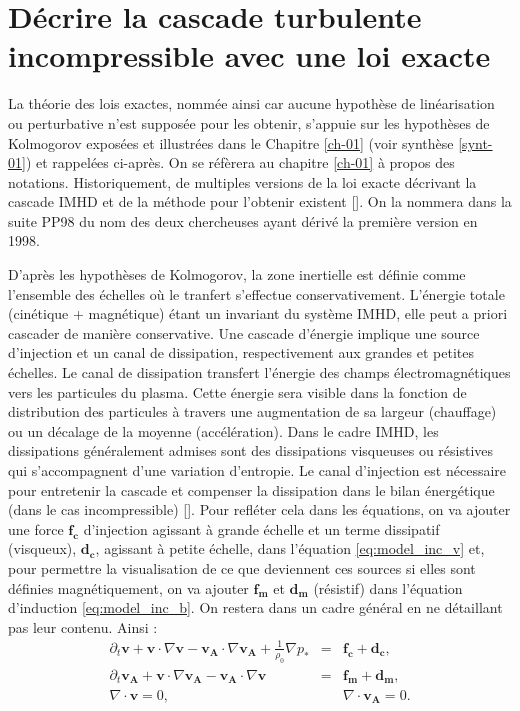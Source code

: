 \section{Décrire la cascade turbulente incompressible avec une loi exacte}
\label{sec-113}
La théorie des lois exactes, nommée ainsi car aucune hypothèse de linéarisation ou perturbative n'est supposée pour les obtenir, s'appuie sur les hypothèses de Kolmogorov exposées et illustrées dans le Chapitre \ref{ch-01} (voir synthèse \ref{synt-01}) et rappelées ci-après. On se réfèrera au chapitre \ref{ch-01} à propos des notations. Historiquement, de multiples versions de la loi exacte décrivant la cascade \acs{IMHD} et de la méthode pour l'obtenir existent [\cite{politano_von_1998,galtier_origin_2018,macbride_turbulent_2008}]. On la nommera dans la suite \acs{PP98} du nom des deux chercheuses ayant dérivé la première version en 1998.

D'après les hypothèses de Kolmogorov, la zone inertielle est définie comme l'ensemble des échelles où le tranfert s'effectue conservativement. L'énergie totale (cinétique + magnétique) étant un invariant du système \acs{IMHD}, elle peut a priori cascader de manière conservative. 
Une cascade d'énergie implique une source d'injection et un canal de dissipation, respectivement aux grandes et petites échelles. Le canal de dissipation transfert l'énergie des champs électromagnétiques vers les particules du plasma. Cette énergie sera visible dans la fonction de distribution des particules à travers une augmentation de sa largeur (chauffage) ou un décalage de la moyenne (accélération). Dans le cadre \acs{IMHD}, les dissipations généralement admises sont des dissipations visqueuses ou résistives qui s'accompagnent d'une variation d'entropie. 
Le canal d'injection est nécessaire pour entretenir la cascade et compenser la dissipation dans le bilan énergétique (dans le cas incompressible) [\cite{galtier_physique_2021}]. Pour refléter cela dans les équations, on va ajouter une force $\boldsymbol{f_c}$ d'injection agissant à grande échelle et un terme dissipatif (visqueux), $\boldsymbol{d_c}$, agissant à petite échelle, dans l'équation \eqref{eq:model_inc_v} et, pour permettre la visualisation de ce que deviennent ces sources si elles sont définies magnétiquement, on va ajouter $\boldsymbol{f_m}$ et $\boldsymbol{d_m}$ (résistif) dans l'équation d'induction \eqref{eq:model_inc_b}. On restera dans un cadre général en ne détaillant pas leur contenu. Ainsi :
\begin{eqnarray}
\label{eq:turb_inc_v} \partial_t \boldsymbol{v} + \boldsymbol{v} \cdot \nabla \boldsymbol{v} -  \boldsymbol{v_A} \cdot \nabla \boldsymbol{v_A} + \frac{1}{\rho_0} \nabla p_* &=&  \boldsymbol{f_c} + \boldsymbol{d_c} , \\
\label{eq:turb_inc_b}  \partial_t \boldsymbol{v_A} + \boldsymbol{v} \cdot \nabla \boldsymbol{v_A} -  \boldsymbol{v_A} \cdot \nabla \boldsymbol{v}&=& \boldsymbol{f_m} + \boldsymbol{d_m} ,\\
\label{eq:turb_inc_r}  \nabla \cdot \boldsymbol{v} = 0, && \nabla \cdot \boldsymbol{v_A} = 0.
\end{eqnarray}

